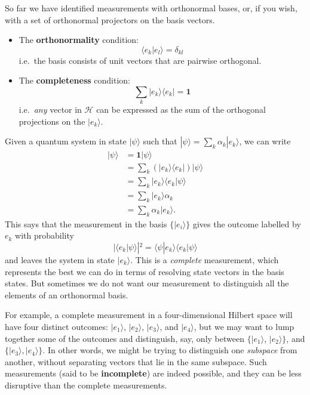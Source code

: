 \documentclass[fleqn]{article}
\providecommand{\tightlist}{%
  \setlength{\itemsep}{0pt}\setlength{\parskip}{0pt}}
\newenvironment{idea}{\noindent}{\medskip}
\begin{document}
So far we have identified measurements with orthonormal bases, or, if you wish, with a set of orthonormal projectors on the basis vectors.

\begin{idea}

\begin{itemize}
\tightlist
\item
  The \textbf{orthonormality} condition:
  \[
      \langle e_k|e_l\rangle = \delta_{kl}
    \]
  i.e.~the basis consists of unit vectors that are pairwise orthogonal.
\item
  The \textbf{completeness} condition:
  \[
      \sum_k|e_k\rangle\langle e_k| = \mathbf{1}
    \]
  i.e.~\emph{any} vector in \(\mathcal{H}\) can be expressed as the sum of the orthogonal projections on the \(|e_k\rangle\).
\end{itemize}


\end{idea}

Given a quantum system in state \(|\psi\rangle\) such that \(|\psi\rangle = \sum_k \alpha_k|e_k\rangle\), we can write
\[
  \begin{aligned}
    |\psi\rangle
    &= \mathbf{1}|\psi\rangle
  \\&= \sum_k (|e_k\rangle\langle e_k|) |\psi\rangle
  \\&= \sum_k |e_k\rangle\langle e_k|\psi\rangle
  \\&= \sum_k |e_k\rangle\alpha_k
  \\&= \sum_k \alpha_k|e_k\rangle.
  \end{aligned}
\]
This says that the measurement in the basis \(\{|e_i\rangle\}\) gives the outcome labelled by \(e_k\) with probability
\[
  |\langle e_k|\psi\rangle|^2 = \langle\psi|e_k\rangle\langle e_k|\psi\rangle
\]
and leaves the system in state \(|e_k\rangle\).
This is a \emph{complete} measurement, which represents the best we can do in terms of resolving state vectors in the basis states.
But sometimes we do not want our measurement to distinguish all the elements of an orthonormal basis.

For example, a complete measurement in a four-dimensional Hilbert space will have four distinct outcomes: \(|e_1\rangle\), \(|e_2\rangle\), \(|e_3\rangle\), and \(|e_4\rangle\), but we may want to lump together some of the outcomes and distinguish, say, only between \(\{|e_1\rangle\), \(|e_2\rangle\}\), and \(\{|e_3\rangle,|e_4\rangle\}\).
In other words, we might be trying to distinguish one \emph{subspace} from another, without separating vectors that lie in the same subspace.
Such measurements (said to be \textbf{incomplete}) are indeed possible, and they can be less disruptive than the complete measurements.
\end{document}
